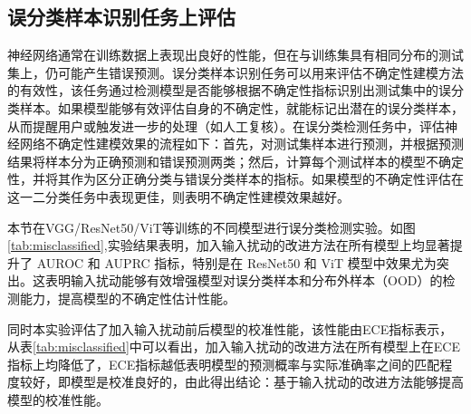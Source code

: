    
\subsection{误分类样本识别任务上评估}
神经网络通常在训练数据上表现出良好的性能，但在与训练集具有相同分布的测试集上，仍可能产生错误预测。误分类样本识别任务可以用来评估不确定性建模方法的有效性，该任务通过检测模型是否能够根据不确定性指标识别出测试集中的误分类样本。如果模型能够有效评估自身的不确定性，就能标记出潜在的误分类样本，从而提醒用户或触发进一步的处理（如人工复核）。在误分类检测任务中，评估神经网络不确定性建模效果的流程如下：首先，对测试集样本进行预测，并根据预测结果将样本分为正确预测和错误预测两类；然后，计算每个测试样本的模型不确定性，并将其作为区分正确分类与错误分类样本的指标。如果模型的不确定性评估在这一二分类任务中表现更佳，则表明不确定性建模效果越好。

本节在VGG/ResNet50/ViT等训练的不同模型进行误分类检测实验。如图\ref{tab:misclassified},实验结果表明，加入输入扰动的改进方法在所有模型上均显著提升了 AUROC 和 AUPRC 指标，特别是在 ResNet50 和 ViT 模型中效果尤为突出。这表明输入扰动能够有效增强模型对误分类样本和分布外样本（OOD）的检测能力，提高模型的不确定性估计性能。

同时本实验评估了加入输入扰动前后模型的校准性能，该性能由ECE指标表示，从表\ref{tab:misclassified}中可以看出，加入输入扰动的改进方法在所有模型上在ECE指标上均降低了，ECE指标越低表明模型的预测概率与实际准确率之间的匹配程度较好，即模型是校准良好的，由此得出结论：基于输入扰动的改进方法能够提高模型的校准性能。
\begin{table}[h]
    \captionsetup{font=small, justification=centering}
    \centering
    \renewcommand{\arraystretch}{1.0} %
    \caption{误分类样本识别任务，实验结果在不同的模型(VGG16、ResNet50、ViT)上做实验对比DDU和基于输入扰动的改进方法对模型不确定性的建模效果，报告指标是AUROC($\uparrow$) / AUPRC($\uparrow$)/ECE($\downarrow$)}
    \label{tab:misclassified}
\end{table}



